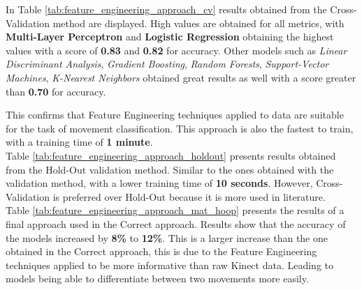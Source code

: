             In Table \ref{tab:feature_engineering_approach_cv} results obtained from the Cross-Validation method are displayed. High values are obtained for all metrics, with \textbf{Multi-Layer Perceptron}  and \textbf{Logistic Regression} obtaining the highest values with a score of \textbf{0.83} and \textbf{0.82} for accuracy. Other models such as \textit{Linear Discriminant Analysis}, \textit{Gradient Boosting}, \textit{Random Forests}, \textit{Support-Vector Machines}, \textit{K-Nearest Neighbors} obtained great results as well with a score greater than \textbf{0.70} for accuracy. 

            This confirms that Feature Engineering techniques applied to data are suitable for the task of movement classification. This approach is also the fastest to train, with a training time of \textbf{1 minute}. \\

            Table \ref{tab:feature_engineering_approach_holdout} presents results obtained from the Hold-Out validation method. Similar to the ones obtained with the validation method, with a lower training time of \textbf{10 seconds}. However, Cross-Validation is preferred over Hold-Out because it is more used in literature.\\

            Table \ref{tab:feature_engineering_approach_mat_hoop} presents the results of a final approach used in the Correct approach. Results show that the accuracy of the models increased by \textbf{8\%} to \textbf{12\%}. This is a larger increase than the one obtained in the Correct approach, this is due to the Feature Engineering techniques applied to be more informative than raw Kinect data. Leading to models being able to differentiate between two movements more easily. \\

